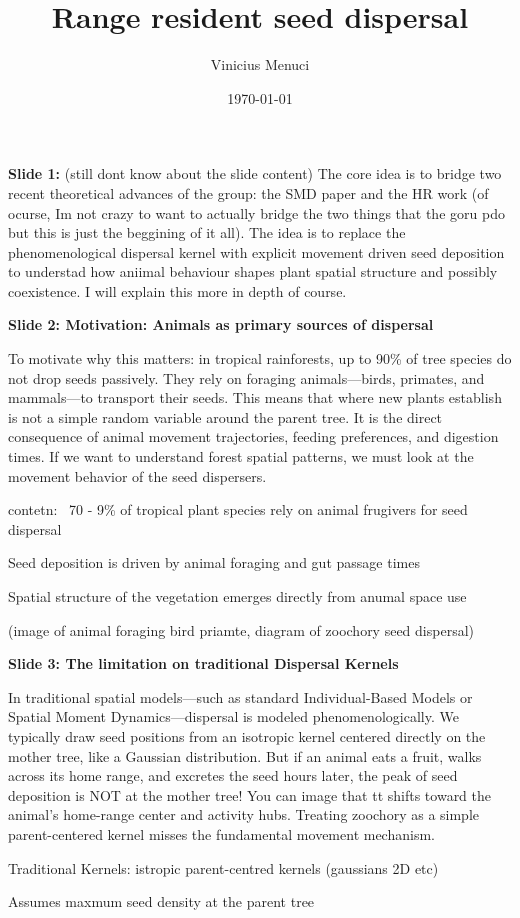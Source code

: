 \documentclass[10pt]{extarticle}
\title{Range resident seed dispersal}
\author{Vinicius Menuci}
\date{\today}
\begin{document}
{\bf Slide 1:}
(still dont know about the slide content)
The core idea is to bridge two recent theoretical advances of the group: the SMD paper and the HR work (of ocurse, Im not crazy to want to actually bridge the two things that the goru pdo but this is just the beggining of it all). The idea is to replace the phenomenological dispersal kernel with explicit movement driven seed deposition to understad how aniimal behaviour shapes plant spatial structure and possibly coexistence. I will explain this more in depth of course.

{\bf Slide 2: Motivation: Animals as primary sources of dispersal}

To motivate why this matters: in tropical rainforests, up to 90\% of tree species do not drop seeds passively. They rely on foraging animals—birds, primates, and mammals—to transport their seeds. This means that where new plants establish is not a simple random variable around the parent tree. It is the direct consequence of animal movement trajectories, feeding preferences, and digestion times. If we want to understand forest spatial patterns, we must look at the movement behavior of the seed dispersers.

contetn: 
~70 - 9\% of tropical plant species rely on animal frugivers for seed dispersal

Seed deposition is driven by animal foraging and gut passage times 

Spatial structure of the vegetation emerges directly from anumal space use 

(image of animal foraging bird priamte, diagram of zoochory seed dispersal)

{\bf Slide 3: The limitation on traditional Dispersal Kernels}

In traditional spatial models—such as standard Individual-Based Models or Spatial Moment Dynamics—dispersal is modeled phenomenologically. We typically draw seed positions from an isotropic kernel centered directly on the mother tree, like a Gaussian distribution. But if an animal eats a fruit, walks across its home range, and excretes the seed hours later, the peak of seed deposition is NOT at the mother tree! You can image that tt shifts toward the animal's home-range center and activity hubs. Treating zoochory as a simple parent-centered kernel misses the fundamental movement mechanism.

Traditional Kernels: istropic parent-centred kernels (gaussians 2D etc)

Assumes maxmum seed density at the parent tree 
\end{document}
